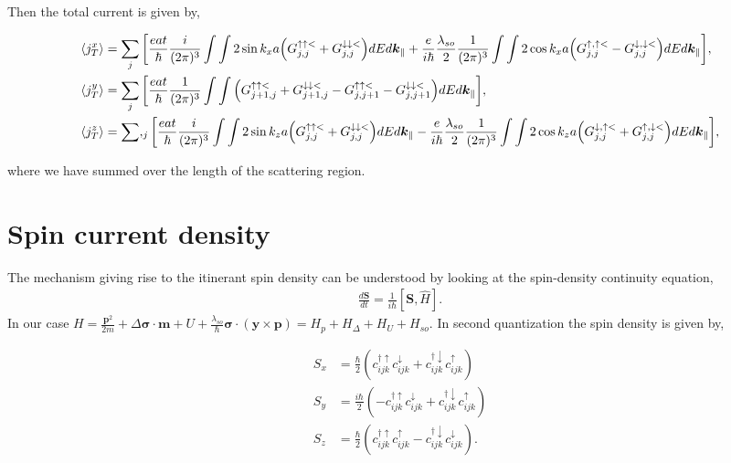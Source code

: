 \documentclass[10pt,prb,showpacs,amssymb,floatfix]{revtex4-1}
\newcommand{\dg}{\dagger}
\newcommand{\dna}{\downarrow}
\newcommand{\para}{\parallel}
\newcommand{\upa}{\uparrow}
\newcommand{\Dlt}{\Delta}
\newcommand{\lam}{\lambda}
\newcommand{\sg}{\sigma}
\newcommand{\h}{\hat}
\begin{document}
Then the total current is given by,

\begin{align}
\label{qchargeokx}
\langle j_{T}^{x} \rangle &= \sum_j \bigg{[}\frac{eat}{\hbar}\frac{i}{(2\pi)^3}\int\int2\sin k_x a \Big{(}G_{j,j}^{\upa\upa <} + G_{j,j}^{\dna\dna <}\Big{)}dE d\bm k _\para + \frac{e}{i\hbar}\frac{\lambda_{so}}{2} \frac{1}{(2\pi)^3} \int \int 2\cos k_x a  \Big{(}  G^{\upa,\upa <}_{j,j}  -  G^{\dna,\dna <}_{j,j}   \Big{)}  dE d\bm k _\para \bigg{]}, \\
\langle j_T^y \rangle &= \sum_j \bigg{[} \frac{eat}{\hbar}\frac{1}{(2\pi)^3} \int \int \Big{(}   G_{j+1,j}^{\upa\upa <}  + G_{j+1,j}^{\dna\dna <} - G_{j,j+1}^{\upa\upa <} - G_{j,j+1}^{\dna\dna <} \Big{)} dE d\bm k _\para \bigg{]}, \label{qchargeoky}\\
\langle j_T^z \rangle &=  \sum,_j \bigg{[}\frac{eat}{\hbar}\frac{i}{(2\pi)^3}\int\int 2\sin k_z a \Big{(} G_{j,j}^{\upa\upa <}+ G_{j,j}^{\dna\dna <} \Big{)} dE d\bm k _\para -\frac{e}{i\hbar}\frac{\lambda_{so}}{2}\frac{1}{(2\pi)^3} \int \int 2\cos k_z a \Big{(} G^{\dna,\upa <}_{j,j}+ G^{\upa,\dna <}_{j,j} \Big{)} dE d\bm k _\para \bigg{]},
\label{qchargeokz}
\end{align}

where we have summed over the length of the scattering region. 


\section{Spin current density}
The mechanism giving rise to the itinerant spin density can be understood by looking at the spin-density continuity equation,
\begin{align}
\frac{d\bm S}{dt} = \frac{1}{i\hbar}[\bm S, \h H].
\end{align}
In our case $H = \frac{\bm p^2}{2m} + \Dlt \bm \sg \cdot \bm m + U + \frac{\lam_{so}}{\hbar} \bm \sg \cdot (\bm y \times \bm p) = H_p + H_\Dlt + H_U + H_{so}.$ In second quantization the spin density is given by,

\begin{align}
S_x &= \frac{\hbar}{2} (c_{ijk}^{\dg\upa} c_{ijk}^{\dna} + c_{ijk}^{\dg\dna} c_{ijk}^{\upa}) \\
S_y &= \frac{i\hbar}{2} (-c_{ijk}^{\dg\upa} c_{ijk}^{\dna} + c_{ijk}^{\dg\dna} c_{ijk}^{\upa}) \\
S_z &= \frac{\hbar}{2} (c_{ijk}^{\dg\upa} c_{ijk}^{\upa} - c_{ijk}^{\dg\dna} c_{ijk}^{\dna}).
\end{align}
\end{document}
